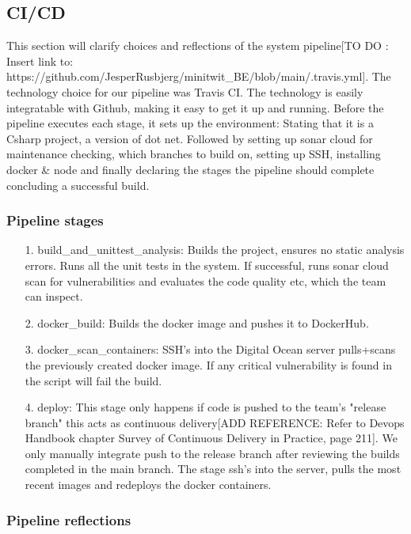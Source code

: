 \subsection{CI/CD}
\label{cicd:label}

This section will clarify choices and reflections of the system pipeline[TO DO : Insert link to: https://github.com/JesperRusbjerg/minitwit_BE/blob/main/.travis.yml]. The technology choice for our pipeline was Travis CI. The technology is easily integratable with Github, making it easy to get it up and running. Before the pipeline executes each stage, it sets up the environment: Stating that it is a Csharp project, a version of dot net. Followed by setting up sonar cloud for maintenance checking, which branches to build on, setting up SSH, installing docker \& node and finally declaring the stages the pipeline should complete concluding a successful build.

\subsubsection*{Pipeline stages}

\begin{enumerate}
  \item[1.] build\_and\_unittest\_analysis: Builds the project, ensures no static analysis errors. Runs all the unit tests in the system. If successful, runs sonar cloud scan for vulnerabilities and evaluates the code quality etc, which the team can inspect.
  \item[2.] docker\_build: Builds the docker image and pushes it to DockerHub.
  \item[3.] docker\_scan\_containers: SSH's into the Digital Ocean server pulls+scans the previously created docker image. If any critical vulnerability is found in the script will fail the build.
  \item[4.] deploy: This stage only happens if code is pushed to the team's "release branch" this acts as continuous delivery[ADD REFERENCE: Refer to Devops Handbook chapter Survey of Continuous Delivery in Practice, page 211]. We only manually integrate push to the release branch after reviewing the builds completed in the main branch. The stage ssh's into the server, pulls the most recent images and redeploys the docker containers.
\end{enumerate}

\subsubsection*{Pipeline reflections}

